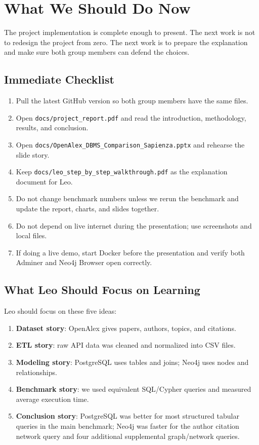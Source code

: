 \documentclass[11pt]{article}
\begin{document}
\section{What We Should Do Now}

The project implementation is complete enough to present.
The next work is not to redesign the project from zero.
The next work is to prepare the explanation and make sure both group members can defend the choices.

\subsection{Immediate Checklist}

\begin{enumerate}
    \item Pull the latest GitHub version so both group members have the same files.
    \item Open \texttt{docs/project\_report.pdf} and read the introduction, methodology, results, and conclusion.
    \item Open \texttt{docs/OpenAlex\_DBMS\_Comparison\_Sapienza.pptx} and rehearse the slide story.
    \item Keep \texttt{docs/leo\_step\_by\_step\_walkthrough.pdf} as the explanation document for Leo.
    \item Do not change benchmark numbers unless we rerun the benchmark and update the report, charts, and slides together.
    \item Do not depend on live internet during the presentation; use screenshots and local files.
    \item If doing a live demo, start Docker before the presentation and verify both Adminer and Neo4j Browser open correctly.
\end{enumerate}

\subsection{What Leo Should Focus on Learning}

Leo should focus on these five ideas:

\begin{enumerate}
    \item \textbf{Dataset story}: OpenAlex gives papers, authors, topics, and citations.
    \item \textbf{ETL story}: raw API data was cleaned and normalized into CSV files.
    \item \textbf{Modeling story}: PostgreSQL uses tables and joins; Neo4j uses nodes and relationships.
    \item \textbf{Benchmark story}: we used equivalent SQL/Cypher queries and measured average execution time.
    \item \textbf{Conclusion story}: PostgreSQL was better for most structured tabular queries in the main benchmark; Neo4j was faster for the author citation network query and four additional supplemental graph/network queries.
\end{enumerate}
\end{document}
